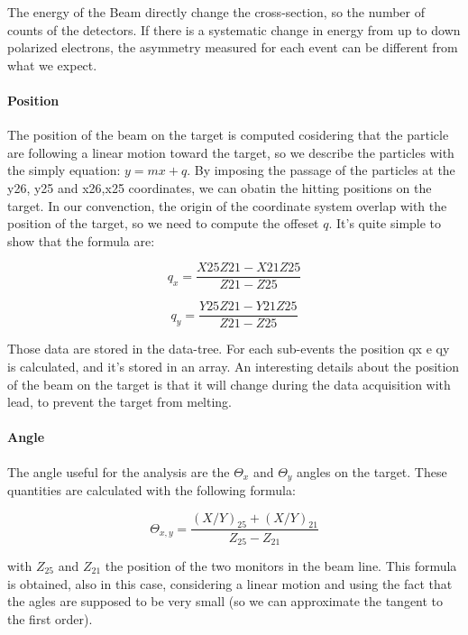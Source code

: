 \documentclass[10pt,a4paper]{article}
\begin{document}
The energy of the Beam directly change the cross-section, so the number of counts of the detectors. If there is a systematic change in energy from up to down polarized electrons, the asymmetry measured for each event can be different from what we expect. 

\paragraph{Position}
The position of the beam on the target is computed cosidering that the particle are following a linear motion toward the target, so we describe the particles with the simply equation: $y = mx + q$. By imposing the passage of the particles at the y26, y25 and x26,x25 coordinates, we can obatin the hitting positions on the target. In our convenction, the origin of the coordinate system overlap with the position of the target, so we need to compute the offeset $q$. It's quite simple to show that the formula are:

\begin{equation}
q_{x} = \dfrac{X25 Z21 - X21 Z25}{Z21 - Z25}
\end{equation}

\begin{equation}
q_{y} = \dfrac{Y25 Z21 - Y21 Z25}{Z21 - Z25}
\end{equation}

Those data are stored in the data-tree. For each sub-events the position qx e qy is calculated, and it's stored in an array. An interesting details about the position of the beam on the target is that it will change during the data acquisition with lead, to prevent the target from melting.

\paragraph{Angle}
The angle useful for the analysis are the $\Theta_{x}$ and $\Theta_{y}$ angles on the target. These quantities are calculated with the following formula:

\begin{equation}
\Theta_{x,y} = \dfrac{(X/Y)_{25} +  (X/Y)_{21}}{ Z_{25} - Z_{21}} 
\end{equation}

with $Z_{25}$ and $Z_{21}$ the position of the two monitors in the beam line. This formula is obtained, also in this case, considering a linear motion and using the fact that the agles are supposed to be very small (so we can approximate the tangent to the first order).
\end{document}
